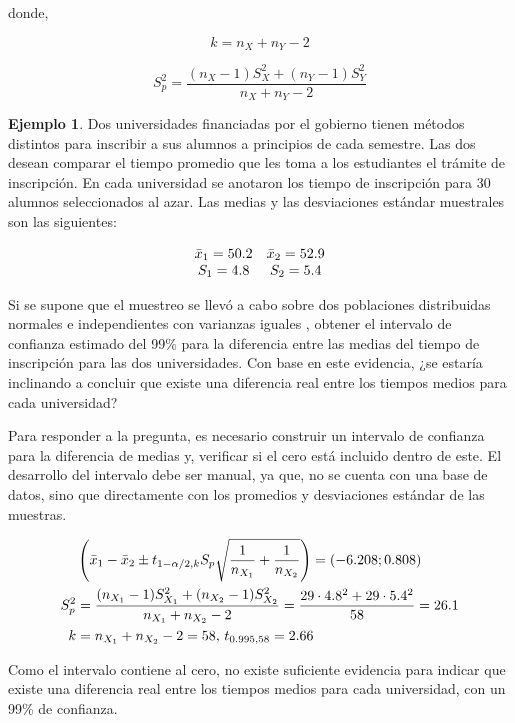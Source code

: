 \documentclass[
  11pt,
]{book}
\theoremstyle{definition}
\theoremstyle{definition}
\newtheorem{example}{Ejemplo}[chapter]
\theoremstyle{definition}
\theoremstyle{definition}
\theoremstyle{remark}
\begin{document}
donde,

\[k = n_X + n_Y-2\]

\[S_p^2 = \frac{(n_X-1)S_X^2 + (n_Y-1)S_Y^2}{n_X+n_Y-2}\]

\begin{example}
\protect\hypertarget{exm:ejemploICdiferencia}{}\label{exm:ejemploICdiferencia}Dos universidades financiadas por el gobierno tienen métodos distintos para inscribir a sus alumnos a principios de cada semestre. Las dos desean comparar el tiempo promedio que les toma a los estudiantes el trámite de inscripción. En cada universidad se anotaron los tiempo de inscripción para 30 alumnos seleccionados al azar. Las medias y las desviaciones estándar muestrales son las siguientes:

\begin{equation}
\notag
\begin{matrix}
\bar{x}_1 = 50.2 & \bar{x}_2=52.9\\
S_1 = 4.8 & S_2 = 5.4
\end{matrix}
\end{equation}

Si se supone que el muestreo se llevó a cabo sobre dos poblaciones distribuidas normales e independientes con varianzas iguales , obtener el intervalo de confianza estimado del 99\% para la diferencia entre las medias del tiempo de inscripción para las dos universidades. Con base en este evidencia, ¿se estaría inclinando a concluir que existe una diferencia real entre los tiempos medios para cada universidad?

Para responder a la pregunta, es necesario construir un intervalo de confianza para la diferencia de medias y, verificar si el cero está incluido dentro de este. El desarrollo del intervalo debe ser manual, ya que, no se cuenta con una base de datos, sino que directamente con los promedios y desviaciones estándar de las muestras.

\begin{equation}
\notag
\begin{split}
&\left(\bar{x}_1 - \bar{x}_2 \pm t_{1-\alpha/2,k}S_p\displaystyle\sqrt{\displaystyle\frac{1}{n_{X_1}} + \displaystyle\frac{1}{n_{X_2}}}\right) = \left(-6.208;0.808 \right)\\
S_p^2 &= \frac{(n_{X_1}-1)S_{X_1}^2 + (n_{X_2}-1)S_{X_2}^2}{n_{X_1}+n_{X_2}-2} = \frac{29\cdot 4.8^2 + 29\cdot 5.4^2}{58} = 26.1\\
k &= n_{X_1} + n_{X_2}-2 = 58 \text{, } t_{0.995, 58} = 2.66\\
\end{split}
\end{equation}

Como el intervalo contiene al cero, no existe suficiente evidencia para indicar que existe una diferencia real entre los tiempos medios para cada universidad, con un 99\% de confianza.
\end{example}
\end{document}
